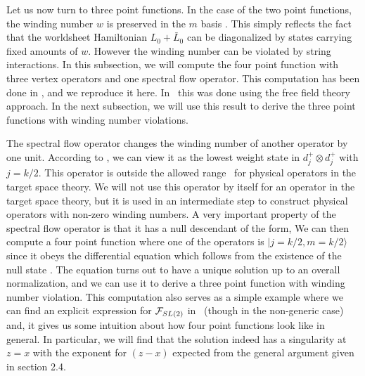 
Let us now turn to three point functions.
In the case of the two point functions, the winding number
$w$ is preserved in the $m$ basis \twoptfl . This simply
reflects the fact that the worldsheet Hamiltonian $L_0 + \bar{L}_0$
can be diagonalized by states carrying fixed amounts of $w$.
However the winding number
can be violated by string interactions. In this subsection,
we will compute the four point function with
three vertex operators  and  one  spectral flow operator.
This computation has been done in \zam , and we
reproduce it here. In \giribet\ this  was done using the free
field theory approach.
 In the next subsection, we will use
this result to derive
the three point functions with winding number violations.

The spectral flow operator
changes the winding number of another operator by one unit.
According to \first, we can view it
as the lowest weight
state in $d_j^+ \otimes d_j^+$ with $j=k/2$. This operator is outside the
allowed range \range\ for physical operators in the target space theory.
We will not use this operator by itself for  an operator in the
target space theory, but it is used in an intermediate step
to construct physical operators with non-zero winding numbers.
A very important property of  the spectral flow operator is that
it  has a null
descendant of the form,
\eqn{}
 We can then compute a four point function where one
of the operators is $|j=k/2, m=k/2 \rangle$ since
it obeys the differential equation which follows from
the existence of the null state \nulldec . The
equation turns out to have a unique solution up to
an overall normalization, and we can use it to derive
a three point function with winding number violation.
This computation also serves as a simple example where
we can find an explicit expression
for ${\cal F}_{SL(2)}$ in \nnn\
(though in the non-generic case) and, it gives us
some intuition about how four point functions
look like in general. In particular,
we will find that the solution indeed has a singularity
at $z=x$ with the exponent for $(z-x)$ expected from the
general argument given in section 2.4.

